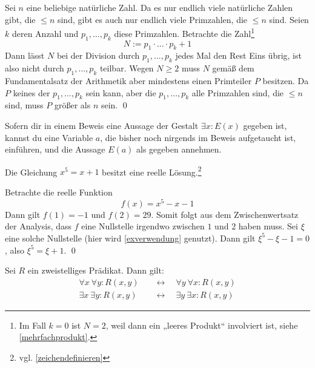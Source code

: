 \begin{bew}
    Sei $n$ eine beliebige natürliche Zahl. Da es nur endlich viele natürliche Zahlen gibt, die $\le n$ sind, gibt es auch nur endlich viele Primzahlen, die $\le n$ sind. Seien $k$ deren Anzahl und $p_1,\dots , p_k$ diese Primzahlen. Betrachte die Zahl\footnote{Im Fall $k=0$ ist $N=2$, weil dann ein „leeres Produkt“ involviert ist, siehe \cref{mehrfachprodukt}.}
        \[ N := p_1\cdot\ldots\cdot p_k + 1 \]
    Dann lässt $N$ bei der Division durch $p_1,\dots , p_k$ jedes Mal den Rest Eins übrig, ist also nicht durch $p_1,\dots , p_k$ teilbar. Wegen $N\ge 2$ muss $N$ gemäß dem Fundamentalsatz der Arithmetik aber mindestens einen Primteiler $P$ besitzen. Da $P$ keines der $p_1,\dots ,p_k$ sein kann, aber die $p_1,\dots , p_k$ alle Primzahlen sind, die $\le n$ sind, muss $P$ größer als $n$ sein. \qed
\end{bew}


\begin{axiom} \label{exverwendung}
    Sofern dir in einem Beweis eine Aussage der Gestalt $\exists x: E(x)$ gegeben ist, kannst du eine Variable $a$, die bisher noch nirgends im Beweis aufgetaucht ist, einführen, und die Aussage $E(a)$ als gegeben annehmen.
\end{axiom}
  
  
\begin{bsp} \label{bsp:exverwendung}
    Die Gleichung $x^5=x+1$ besitzt eine reelle Lösung.\footnote{vgl. \cref{zeichendefinieren}}
\end{bsp}


\begin{bew}
    Betrachte die reelle Funktion
        \[ f(x) = x^5-x-1 \]
    Dann gilt $f(1)=-1$ und $f(2)=29$. Somit folgt aus dem Zwischenwertsatz der Analysis, dass $f$ eine Nullstelle irgendwo zwischen $1$ und $2$ haben muss. Sei $\xi$ eine solche Nullstelle (hier wird \cref{exverwendung} genutzt). Dann gilt $\xi^5-\xi-1=0$, also $\xi^5=\xi +1$. \qed
\end{bew}


\begin{satz} \label{quantorentausch}
    Sei $R$ ein zweistelliges Prädikat. Dann gilt:
    \begin{align*}
        \forall x\ \forall y: R(x,y) \quad &\leftrightarrow\quad \forall y\ \forall x: R(x,y) \\
        \exists x\ \exists y: R(x,y) \quad &\leftrightarrow\quad  \exists y\ \exists x: R(x,y)
    \end{align*}
\end{satz}


